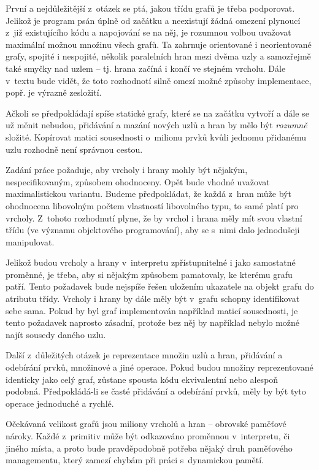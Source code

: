 \documentclass[11pt,twoside,a4paper]{book}
\begin{document}
První a nejdůležitější z~otázek se ptá, jakou třídu grafů je třeba podporovat. Jelikož je program psán úplně od začátku a neexistují žádná omezení plynoucí z~již existujícího kódu a napojování se na něj, je rozumnou volbou uvažovat maximální možnou množinu všech grafů. Ta zahrnuje orientované i neorientované grafy, spojité i nespojité, několik paralelních hran mezi dvěma uzly a samozřejmě také smyčky nad uzlem -- tj. hrana začíná i končí ve stejném vrcholu. Dále v~textu bude vidět, že toto rozhodnotí silně omezí možné způsoby implementace, popř. je výrazně zesložití.

Ačkoli se předpokládají spíše statické grafy, které se na začátku vytvoří a dále se už měnit nebudou, přidávání a mazání nových uzlů a hran by mělo být \textit{rozumně} složité. Kopírovat matici sousednosti o~milionu prvků kvůli jednomu přidanému uzlu rozhodně není správnou cestou.

Zadání práce požaduje, aby vrcholy i hrany mohly být nějakým, nespecifikovaným, způsobem ohodnoceny. Opět bude vhodné uvažovat maximalistickou variantu. Budeme předpokládat, že každá z~hran může být ohodnocena libovolným počtem vlastností libovolného typu, to samé platí pro vrcholy. Z~tohoto rozhodnutí plyne, že by vrchol i hrana měly mít svou vlastní třídu (ve významu objektového programování), aby se s~nimi dalo jednodušeji manipulovat.

Jelikož budou vrcholy a hrany v~interpretu zpřístupnitelné i jako samostatné proměnné, je třeba, aby si nějakým způsobem pamatovaly, ke kterému grafu patří. Tento požadavek bude nejspíše řešen uložením ukazatele na objekt grafu do atributu třídy. Vrcholy i hrany by dále měly být v~grafu schopny identifikovat sebe sama. Pokud by byl graf implementován například maticí sousednosti, je tento požadavek naprosto zásadní, protože bez něj by například nebylo možné najít sousedy daného uzlu.

Další z~důležitých otázek je reprezentace množin uzlů a hran, přidávání a odebírání prvků, množinové a jiné operace. Pokud budou množiny reprezentované identicky jako celý graf, zůstane spousta kódu ekvivalentní nebo alespoň podobná. Předpokládá-li se časté přidávání a odebírání prvků, měly by být tyto operace jednoduché a rychlé.

Očekávaná velikost grafů jsou miliony vrcholů a hran -- ob\-rov\-ské pa\-mě\-ťo\-vé nároky. Každé z~primitiv může být odkazováno proměnnou v~interpretu, či jiného místa, a proto bude pravděpodobně potřeba nějaký druh paměťového managementu, který zamezí chybám při práci s~dynamickou pamětí.
\end{document}
